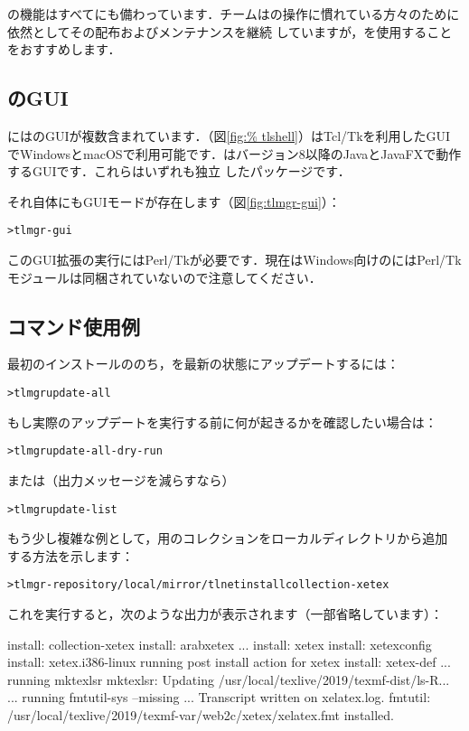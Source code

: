 \documentclass[uplatex,dvipdfmx,tombow]{jsarticle}
\begin{document}
の機能はすべてにも備わっています．\TL チームはの操作に慣れている方々のために依然としてその配布およびメンテナンスを継続
していますが，を使用することをおすすめします．

\subsection{のGUI}

\TL にはのGUIが複数含まれています．（図\ref{fig:%
tlshell}）はTcl/Tkを利用したGUIでWindowsとmacOSで利用可能です．はバージョン8以降のJavaとJavaFXで動作するGUIです．これらはいずれも独立
したパッケージです．

それ自体にもGUIモードが存在します（図\ref{fig:tlmgr-gui}）：
%
\begin{alltt}
> tlmgr -gui
\end{alltt}
%
このGUI拡張の実行にはPerl/Tkが必要です．現在はWindows向けの\TL にはPerl/Tk%
モジュールは同梱されていないので注意してください．

\subsection{コマンド使用例}

最初のインストールののち，\TL を最新の状態にアップデートするには：
%
\begin{alltt}
> tlmgr update -all
\end{alltt}
%
もし実際のアップデートを実行する前に何が起きるかを確認したい場合は：
%
\begin{alltt}
> tlmgr update -all -dry-run
\end{alltt}
%
または（出力メッセージを減らすなら）
%
\begin{alltt}
> tlmgr update -list
\end{alltt}

もう少し複雑な例として，\XeTeX 用のコレクションをローカルディレクトリから追加
する方法を示します：
%
\begin{alltt}
> tlmgr -repository /local/mirror/tlnet install collection-xetex
\end{alltt}
%
これを実行すると，次のような出力が表示されます（一部省略しています）：
%
\begin{fverbatim}
install: collection-xetex
install: arabxetex
...
install: xetex
install: xetexconfig
install: xetex.i386-linux
running post install action for xetex
install: xetex-def
...
running mktexlsr
mktexlsr: Updating /usr/local/texlive/2019/texmf-dist/ls-R...
...
running fmtutil-sys --missing
...
Transcript written on xelatex.log.
fmtutil: /usr/local/texlive/2019/texmf-var/web2c/xetex/xelatex.fmt installed.
\end{fverbatim}
\end{document}
